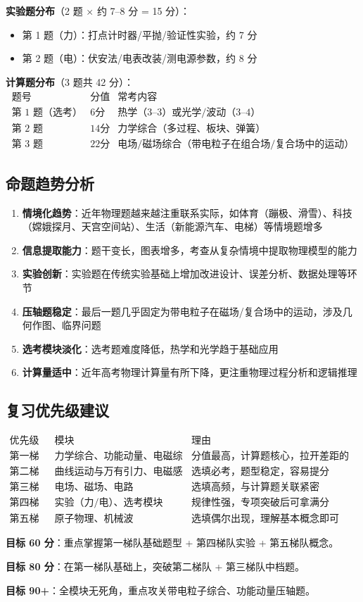 \textbf{实验题分布}（2 题 $\times$ 约 7--8 分 = 15 分）：
\begin{itemize}
  \item 第 1 题（力）：打点计时器/平抛/验证性实验，约 7 分
  \item 第 2 题（电）：伏安法/电表改装/测电源参数，约 8 分
\end{itemize}

\textbf{计算题分布}（3 题共 42 分）：
\[
\begin{array}{c|c|c}
\text{题号} & \text{分值} & \text{常考内容} \\ \hline
\text{第 1 题（选考）} & 6 分 & \text{热学（3--3）或光学/波动（3--4）} \\
\text{第 2 题} & 14 分 & \text{力学综合（多过程、板块、弹簧）} \\
\text{第 3 题} & 22 分 & \text{电场/磁场综合（带电粒子在组合场/复合场中的运动）}
\end{array}
\]

\subsection{命题趋势分析}

\begin{enumerate}
  \item \textbf{情境化趋势}：近年物理题越来越注重联系实际，如体育（蹦极、滑雪）、科技（嫦娥探月、天宫空间站）、生活（新能源汽车、电梯）等情境题增多
  \item \textbf{信息提取能力}：题干变长，图表增多，考查从复杂情境中提取物理模型的能力
  \item \textbf{实验创新}：实验题在传统实验基础上增加改进设计、误差分析、数据处理等环节
  \item \textbf{压轴题稳定}：最后一题几乎固定为带电粒子在磁场/复合场中的运动，涉及几何作图、临界问题
  \item \textbf{选考模块淡化}：选考题难度降低，热学和光学趋于基础应用
  \item \textbf{计算量适中}：近年高考物理计算量有所下降，更注重物理过程分析和逻辑推理
\end{enumerate}

\subsection{复习优先级建议}

\[
\begin{array}{c|c|c}
\text{优先级} & \text{模块} & \text{理由} \\ \hline
\textbf{第一梯队} & \text{力学综合、功能动量、电磁综合} & \text{分值最高，计算题核心，拉开差距的关键} \\
\textbf{第二梯队} & \text{曲线运动与万有引力、电磁感应} & \text{选填必考，题型稳定，容易提分} \\
\textbf{第三梯队} & \text{电场、磁场、电路} & \text{选填高频，与计算题关联紧密} \\
\textbf{第四梯队} & \text{实验（力/电）、选考模块} & \text{规律性强，专项突破后可拿满分} \\
\textbf{第五梯队} & \text{原子物理、机械波} & \text{选填偶尔出现，理解基本概念即可}
\end{array}
\]

\textbf{目标 60 分}：重点掌握第一梯队基础题型 + 第四梯队实验 + 第五梯队概念。

\textbf{目标 80 分}：在第一梯队基础上，突破第二梯队 + 第三梯队中档题。

\textbf{目标 90+}：全模块无死角，重点攻关带电粒子综合、功能动量压轴题。
